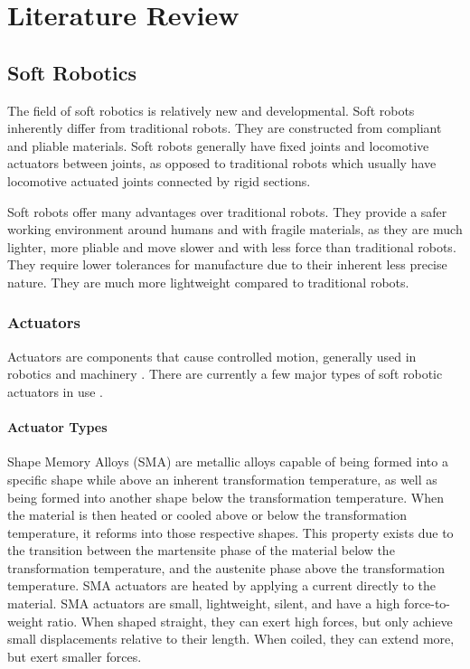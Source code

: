 \chapter{Literature Review}
\label{chp:LR}


\section{Soft Robotics}

The field of soft robotics is relatively new and developmental. Soft robots inherently differ from traditional robots. They are constructed from compliant and pliable materials. Soft robots generally have fixed joints and locomotive actuators between joints, as opposed to traditional robots which usually have locomotive actuated joints connected by rigid sections. \cite{Whitesides2018}

Soft robots offer many advantages over traditional robots. They provide a safer working environment around humans and with fragile materials, as they are much lighter, more pliable and move slower and with less force than traditional robots. They require lower tolerances for manufacture due to their inherent less precise nature. They are much more lightweight compared to traditional robots. \cite{Whitesides2018}

\subsection{Actuators}

Actuators are components that cause controlled motion, generally used in robotics and machinery \cite{Sekhar2012}. There are currently a few major types of soft robotic actuators in use \cite{Boyraz2018}.

\subsubsection{Actuator Types}

Shape Memory Alloys (SMA) are metallic alloys capable of being formed into a specific shape while above an inherent transformation temperature, as well as being formed into another shape below the transformation temperature. When the material is then heated or cooled above or below the transformation temperature, it reforms into those respective shapes. This property exists due to the transition between the martensite phase of the material below the transformation temperature, and the austenite phase above the transformation temperature. SMA actuators are heated by applying a current directly to the material. SMA actuators are small, lightweight, silent, and have a high force-to-weight ratio. When shaped straight, they can exert high forces, but only achieve small displacements relative to their length. When coiled, they can extend more, but exert smaller forces. \cite{Villoslada2015}

